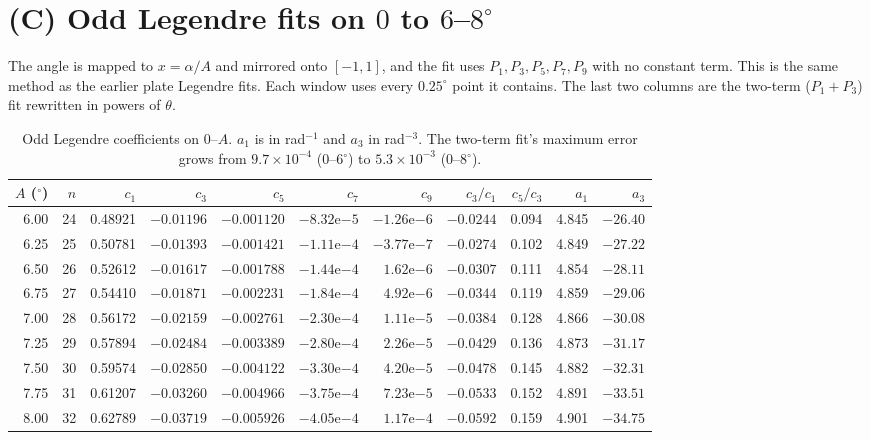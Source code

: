 \documentclass[11pt,a4paper]{article}
\begin{document}
\section{(C) Odd Legendre fits on $0$ to $6$--$8^\circ$}

The angle is mapped to $x = \alpha/A$ and mirrored onto $[-1,1]$, and the fit uses
$P_1,P_3,P_5,P_7,P_9$ with no constant term. This is the same method as the earlier plate
Legendre fits. Each window uses every $0.25^\circ$ point it contains. The last two columns are
the two-term ($P_1+P_3$) fit rewritten in powers of $\theta$.

\begin{table}[h]
\centering\footnotesize
\setlength{\tabcolsep}{4pt}
\begin{tabular}{rrrrrrrrrrr}
\toprule
$A$ ($^\circ$) & $n$ & $c_1$ & $c_3$ & $c_5$ & $c_7$ & $c_9$ & $c_3/c_1$ & $c_5/c_3$ & $a_1$ & $a_3$ \\
\midrule
6.00 & 24 & 0.48921 & $-0.01196$ & $-0.001120$ & $-8.32\mathrm{e}{-5}$ & $-1.26\mathrm{e}{-6}$ & $-0.0244$ & 0.094 & 4.845 & $-26.40$ \\
6.25 & 25 & 0.50781 & $-0.01393$ & $-0.001421$ & $-1.11\mathrm{e}{-4}$ & $-3.77\mathrm{e}{-7}$ & $-0.0274$ & 0.102 & 4.849 & $-27.22$ \\
6.50 & 26 & 0.52612 & $-0.01617$ & $-0.001788$ & $-1.44\mathrm{e}{-4}$ & $1.62\mathrm{e}{-6}$ & $-0.0307$ & 0.111 & 4.854 & $-28.11$ \\
6.75 & 27 & 0.54410 & $-0.01871$ & $-0.002231$ & $-1.84\mathrm{e}{-4}$ & $4.92\mathrm{e}{-6}$ & $-0.0344$ & 0.119 & 4.859 & $-29.06$ \\
7.00 & 28 & 0.56172 & $-0.02159$ & $-0.002761$ & $-2.30\mathrm{e}{-4}$ & $1.11\mathrm{e}{-5}$ & $-0.0384$ & 0.128 & 4.866 & $-30.08$ \\
7.25 & 29 & 0.57894 & $-0.02484$ & $-0.003389$ & $-2.80\mathrm{e}{-4}$ & $2.26\mathrm{e}{-5}$ & $-0.0429$ & 0.136 & 4.873 & $-31.17$ \\
7.50 & 30 & 0.59574 & $-0.02850$ & $-0.004122$ & $-3.30\mathrm{e}{-4}$ & $4.20\mathrm{e}{-5}$ & $-0.0478$ & 0.145 & 4.882 & $-32.31$ \\
7.75 & 31 & 0.61207 & $-0.03260$ & $-0.004966$ & $-3.75\mathrm{e}{-4}$ & $7.23\mathrm{e}{-5}$ & $-0.0533$ & 0.152 & 4.891 & $-33.51$ \\
8.00 & 32 & 0.62789 & $-0.03719$ & $-0.005926$ & $-4.05\mathrm{e}{-4}$ & $1.17\mathrm{e}{-4}$ & $-0.0592$ & 0.159 & 4.901 & $-34.75$ \\
\bottomrule
\end{tabular}
\caption{Odd Legendre coefficients on $0$--$A$. $a_1$ is in rad$^{-1}$ and $a_3$ in rad$^{-3}$.
The two-term fit's maximum error grows from $9.7\times10^{-4}$ (0--6$^\circ$) to
$5.3\times10^{-3}$ (0--8$^\circ$).}
\label{tab:C}
\end{table}
\end{document}
